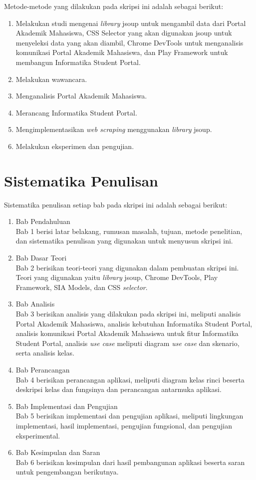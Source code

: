 Metode-metode yang dilakukan pada skripsi ini adalah sebagai berikut:

\begin{enumerate}
	\item Melakukan studi mengenai \textit{library} jsoup untuk mengambil data dari Portal Akademik Mahasiswa, CSS Selector yang akan digunakan jsoup untuk menyeleksi data yang akan diambil, Chrome DevTools untuk menganalisis komunikasi Portal Akademik Mahasiswa, dan Play Framework untuk membangun Informatika Student Portal.
	\item Melakukan wawancara.
	\item Menganalisis Portal Akademik Mahasiswa.
	\item Merancang Informatika Student Portal.
	\item Mengimplementasikan \textit{web scraping} menggunakan \textit{library} jsoup.
	\item Melakukan eksperimen dan pengujian.
\end{enumerate}

\section{Sistematika Penulisan}
\label{sec:sistematika_penulisan}

Sistematika penulisan setiap bab pada skripsi ini adalah sebagai berikut:

\begin{enumerate}
  \item Bab Pendahuluan \\
  Bab 1 berisi latar belakang, rumusan masalah, tujuan, metode penelitian,
  dan sistematika penulisan yang digunakan untuk menyusun skripsi ini.
  \item Bab Dasar Teori \\
  Bab 2 berisikan teori-teori yang digunakan dalam pembuatan skripsi ini. Teori
  yang digunakan yaitu \textit{library} jsoup, Chrome DevTools, Play Framework, SIA Models, dan CSS \textit{selector}.
  \item Bab Analisis \\
  Bab 3 berisikan analisis yang dilakukan pada skripsi ini, meliputi analisis Portal Akademik Mahasiswa, analisis kebutuhan Informatika Student Portal, analisis komunikasi Portal Akademik Mahasiswa untuk fitur Informatika Student Portal, analisis \textit{use case} meliputi diagram \textsl{use case} dan skenario, serta analisis kelas. 
	\item Bab Perancangan \\
  Bab 4 berisikan perancangan aplikasi, meliputi diagram kelas rinci beserta deskripsi kelas dan fungsinya dan perancangan antarmuka aplikasi. 
	\item Bab Implementasi dan Pengujian \\
  Bab 5 berisikan implementasi dan pengujian aplikasi, meliputi lingkungan implementasi, hasil implementasi, pengujian fungsional, dan pengujian eksperimental.
	\item Bab Kesimpulan dan Saran \\
  Bab 6 berisikan kesimpulan dari hasil pembangunan aplikasi beserta saran untuk pengembangan berikutnya.
\end{enumerate}
